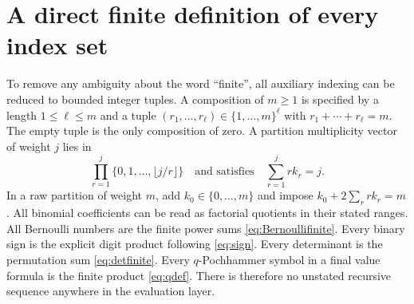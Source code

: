 \documentclass[11pt,oneside]{article}
\theoremstyle{definition}\newtheorem{definition}[theorem]{Definition}
\theoremstyle{remark}\newtheorem{remark}[theorem]{Remark}
\begin{document}
\appendix
\clearpage
\section{A direct finite definition of every index set}
\label{app:indices}
To remove any ambiguity about the word ``finite'', all auxiliary indexing
can be reduced to bounded integer tuples. A composition of $m\ge1$ is
specified by a length $1\le\ell\le m$ and a tuple
$(r_1,\ldots,r_\ell)\in\{1,\ldots,m\}^{\ell}$ with
$r_1+\cdots+r_\ell=m$. The empty tuple is the only composition of zero.
A partition multiplicity vector of weight $j$ lies in
\[
 \prod_{r=1}^{j}\{0,1,\ldots,\lfloor j/r\rfloor\}
 \quad\text{and satisfies}\quad \sum_{r=1}^{j}rk_r=j.
\]
In a raw partition of weight $m$, add
$k_0\in\{0,\ldots,m\}$ and impose $k_0+2\sum_r rk_r=m$.
All binomial coefficients can be read as factorial quotients in their
stated ranges. All Bernoulli numbers are the finite power sums
\eqref{eq:Bernoullifinite}. Every binary sign is the explicit digit product
following \eqref{eq:sign}. Every determinant is the permutation sum
\eqref{eq:detfinite}. Every $q$-Pochhammer symbol in a final value formula
is the finite product \eqref{eq:qdef}. There is therefore no unstated
recursive sequence anywhere in the evaluation layer.
\end{document}
